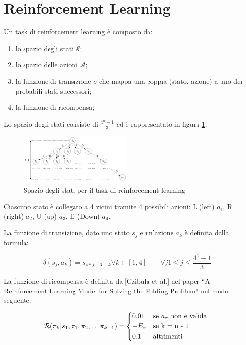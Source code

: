 \documentclass[twocolumn,10pt]{asme2ej}
\begin{document}
\section{Reinforcement Learning}

Un task di reinforcement learning è composto da:

\begin{enumerate}
 \item lo spazio degli stati $\mathcal{S}$;
 \item lo spazio delle azioni $\mathcal{A}$;
 \item la funzione di transizione $\sigma$ che mappa una coppia (stato, azione) a uno dei probabili stati successori;
 \item la funzione di ricompensa;
\end{enumerate}

Lo spazio degli stati consiste di $\frac{4^n - 1}{3}$ ed è rappresentato in figura \ref{fig:stateSpace}.

\begin{figure}[h]
\centering
\includegraphics[width=0.5\textwidth]{figure/stateSpace.png}
\caption{Spazio degli stati per il task di reinforcement learning}
\label{fig:stateSpace}
\end{figure}

Ciascuno stato è collegato a 4 vicini tramite 4 possibili azioni: L (left) $a_1$, R (right) $a_2$, U (up) $a_3$, D (Down) $a_4$.

La funzione di transizione, dato uno stato $s_j$ e un'azione $a_k$ è definita dalla formula:

\begin{equation}
\delta(s_j, a_k) = s_{4*j - 3 + k} \forall k \in [1,4] \qquad \forall j 1 \leq j \leq \frac{4^n - 1}{3}
\end{equation}

La funzione di ricompensa è definita da [Czibula et al.] nel paper ``A Reinforcement Learning Model for Solving the Folding Problem'' nel modo seguente:

\begin{equation}
    \mathcal{R}(\pi_k| s_1, \pi_1, \pi_2, \dots \pi_{k-1}) =
    \begin{cases*}
      0.01 & se $a_{\pi}$ non è valida \\
      - E_{\pi} & se k = n - 1 \\
      0.1 & altrimenti
    \end{cases*}
\end{equation}
\end{document}
